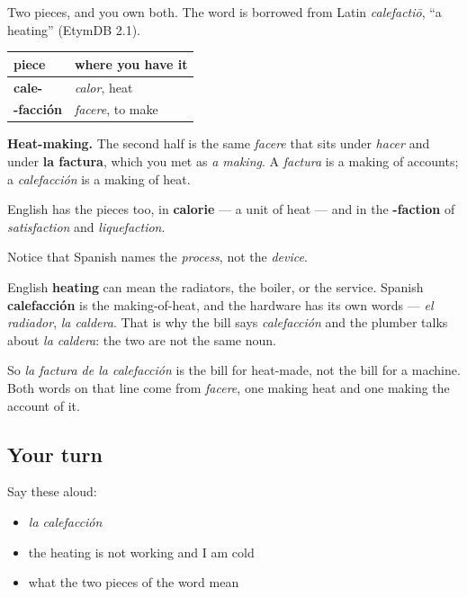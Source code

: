\begin{cousinweb}
Two pieces, and you own both. The word is borrowed from Latin \emph{calefactiō}, \textquotedblleft{}a heating\textquotedblright{} (EtymDB 2.1).

\noindent
\begin{tabularx}{\linewidth}{@{}>{\raggedright\arraybackslash}X>{\raggedright\arraybackslash}X@{}}
\toprule
\textbf{piece} & \textbf{where you have it} \\
\midrule
\textbf{cale-} & \emph{calor}, heat \\
\textbf{-facción} & \emph{facere}, to make \\
\bottomrule
\end{tabularx}

\textbf{Heat-making.} The second half is the same \emph{facere} that sits under \emph{hacer} and under \textbf{la factura}, which you met as \emph{a making}. A \emph{factura} is a making of accounts; a \emph{calefacción} is a making of heat.

English has the pieces too, in \textbf{calorie} — a unit of heat — and in the \textbf{-faction} of \emph{satisfaction} and \emph{liquefaction}.
\end{cousinweb}

\begin{culture}
Notice that Spanish names the \emph{process}, not the \emph{device}.

English \textbf{heating} can mean the radiators, the boiler, or the service. Spanish \textbf{calefacción} is the making-of-heat, and the hardware has its own words — \emph{el radiador}, \emph{la caldera}. That is why the bill says \emph{calefacción} and the plumber talks about \emph{la caldera}: the two are not the same noun.

So \emph{la factura de la calefacción} is the bill for heat-made, not the bill for a machine. Both words on that line come from \emph{facere}, one making heat and one making the account of it.
\end{culture}

\subsection*{Your turn}
Say these aloud:

\begin{itemize}
\raggedright
  \item \emph{la calefacción}
  \item the heating is not working and I am cold
  \item what the two pieces of the word mean
\end{itemize}

